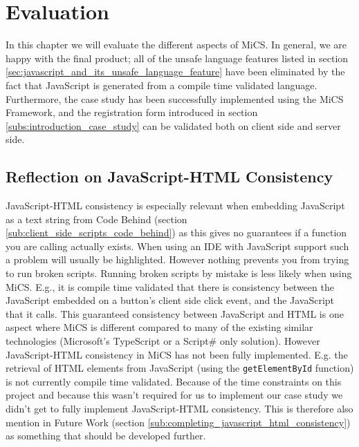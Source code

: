 \chapter{Evaluation}
	In this chapter we will evaluate the different aspects of MiCS. In general, we are happy with the final product; all of the unsafe language features listed in section \ref{sec:javascript_and_its_unsafe_language_feature} have been eliminated by the fact that JavaScript is generated from a compile time validated language. Furthermore, the case study has been successfully implemented using the MiCS Framework, and the registration form introduced in section \ref{subs:introduction_case_study} can be validated both on client side and server side.  







\section{Reflection on JavaScript-HTML Consistency} %
\label{sec:reflection_on_server_client_consistency}
	JavaScript-HTML consistency is especially relevant when embedding JavaScript as a text string from Code Behind (section \ref{sub:client_side_scripts_code_behind}) as this gives no guarantees if a function you are calling actually exists. When using an IDE with JavaScript support such a problem will usually be highlighted. However nothing prevents you from trying to run broken scripts. Running broken scripts by mistake is less likely when using MiCS. E.g., it is compile time validated that there is consistency between the JavaScript embedded on a button’s client side click event, and the JavaScript that it calls. This guaranteed consistency between JavaScript and HTML is one aspect where MiCS is different compared to many of the existing similar technologies (Microsoft’s TypeScript or a Script\# only solution). However JavaScript-HTML consistency in MiCS has not been fully implemented. E.g. the retrieval of HTML elements from JavaScript (using the \texttt{getElementById} function) is not currently compile time validated. Because of the time constraints on this project and because this wasn’t required for us to implement our case study we didn't  get to fully implement JavaScript-HTML consistency. This is therefore also mention in Future Work (section \ref{sub:completing_javascript_html_consistency}) as something that should be developed further.


